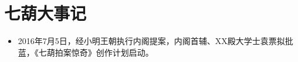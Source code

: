 ﻿%

\chapter{七葫大事记}

\begin{itemize}
    \item{2016年7月5日，经小明王朝执行内阁提案，内阁首辅、XX殿大学士袁票拟批蓝，《七葫拍案惊奇》创作计划启动。}
\end{itemize}
